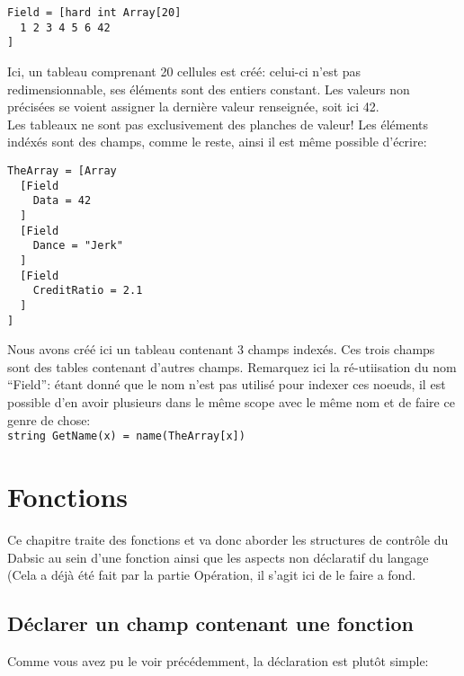 \documentclass[a5paper, 12pt]{book}
\begin{document}
\begin{verbatim}
Field = [hard int Array[20]
  1 2 3 4 5 6 42
]
\end{verbatim}

Ici, un tableau comprenant 20 cellules est créé: celui-ci n'est
pas redimensionnable, ses éléments sont des entiers constant.
Les valeurs non précisées se voient assigner la dernière valeur
renseignée, soit ici 42.\\

Les tableaux ne sont pas exclusivement des planches de valeur!
Les éléments indéxés sont des champs, comme le reste, ainsi il
est même possible d'écrire:\\

\begin{verbatim}
TheArray = [Array
  [Field
    Data = 42
  ]
  [Field
    Dance = "Jerk"
  ]
  [Field
    CreditRatio = 2.1
  ]
]
\end{verbatim}

Nous avons créé ici un tableau contenant 3 champs indexés. Ces
trois champs sont des tables contenant d'autres champs.
Remarquez ici la ré-utiisation du nom ``Field'': étant
donné que le nom n'est pas utilisé pour indexer ces noeuds,
il est possible d'en avoir plusieurs dans le même scope
avec le même nom et de faire ce genre de chose:\\

\verb!string GetName(x) = name(TheArray[x])!\\


\chapter{Fonctions}

Ce chapitre traite des fonctions et va donc aborder les
structures de contrôle du Dabsic au sein d'une fonction
ainsi que les aspects non déclaratif du langage (Cela a
déjà été fait par la partie Opération, il s'agit ici de
le faire a fond.

\section{Déclarer un champ contenant une fonction}

Comme vous avez pu le voir précédemment, la déclaration
est plutôt simple:\\
\end{document}
